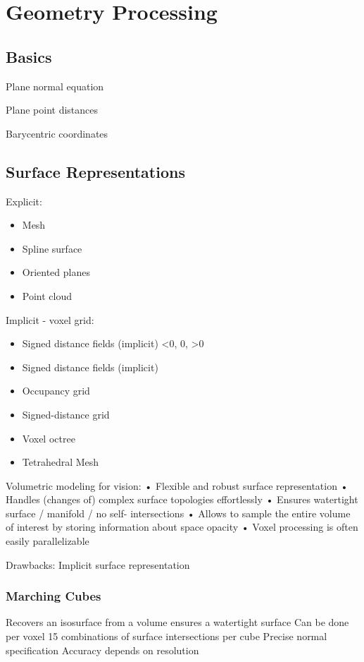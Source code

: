 \chapter{Geometry Processing} 

\section{Basics}

Plane normal equation

Plane point distances

Barycentric coordinates


\section{ Surface Representations}

Explicit:
\begin{itemize}
\item Mesh
\item Spline surface
\item Oriented planes
\item Point cloud
\end{itemize}

Implicit - voxel grid:
\begin{itemize}
\item Signed distance fields (implicit) <0, 0, >0
\item Signed distance fields (implicit)
\item Occupancy grid
\item Signed-distance grid
\item Voxel octree
\item Tetrahedral Mesh
\end{itemize}

Volumetric modeling for vision:
• Flexible and robust surface representation
• Handles (changes of) complex surface topologies effortlessly
• Ensures watertight surface / manifold / no self- intersections
• Allows to sample the entire volume of interest by storing information about space opacity
• Voxel processing is often easily parallelizable


Drawbacks:
Implicit surface representation

\subsection{Marching Cubes}
Recovers an isosurface from a volume
ensures a watertight surface
Can be done per voxel
15 combinations of surface intersections per cube
Precise normal specification
Accuracy depends on resolution

